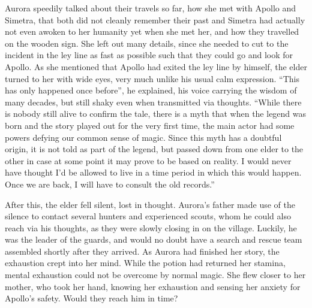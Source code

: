 Aurora speedily talked about their travels so far, how she met with Apollo and Simetra, that both did not cleanly remember their past and Simetra had actually not even awoken to her humanity yet when she met her, and how they travelled on the wooden sign. She left out many details, since she needed to cut to the incident in the ley line as fast as possible such that they could go and look for Apollo. As she mentioned that Apollo had exited the ley line by himself, the elder turned to her with wide eyes, very much unlike his usual calm expression. \enquote{This has only happened once before}, he explained, his voice carrying the wisdom of many decades, but still shaky even when transmitted via thoughts. \enquote{While there is nobody still alive to confirm the tale, there is a myth that when the legend was born and the story played out for the very first time, the main actor had some powers defying our common sense of magic. Since this myth has a doubtful origin, it is not told as part of the legend, but passed down from one elder to the other in case at some point it may prove to be based on reality. I would never have thought I'd be allowed to live in a time period in which this would happen. Once we are back, I will have to consult the old records.}

After this, the elder fell silent, lost in thought. Aurora's father made use of the silence to contact several hunters and experienced scouts, whom he could also reach via his thoughts, as they were slowly closing in on the village. Luckily, he was the leader of the guards, and would no doubt have a search and rescue team assembled shortly after they arrived. As Aurora had finished her story, the exhaustion crept into her mind. While the potion had returned her stamina, mental exhaustion could not be overcome by normal magic. She flew closer to her mother, who took her hand, knowing her exhaustion and sensing her anxiety for Apollo's safety. Would they reach him in time?
